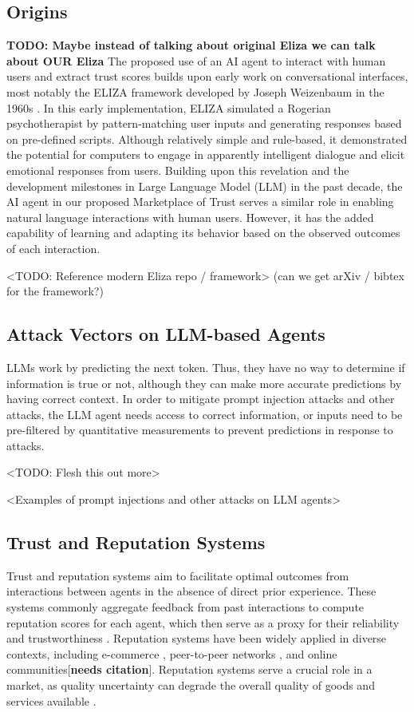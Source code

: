 \documentclass{article}
\begin{document}
\subsection{Origins}

\textbf{TODO: Maybe instead of talking about original Eliza we can talk about OUR Eliza
}
The proposed use of an AI agent to interact with human users and extract trust scores builds upon early work on conversational interfaces, most notably the ELIZA framework developed by Joseph Weizenbaum in the 1960s \cite{ELIZAWeizenbaum1966}. In this early implementation, ELIZA simulated a Rogerian psychotherapist by pattern-matching user inputs and generating responses based on pre-defined scripts. Although relatively simple and rule-based, it demonstrated the potential for computers to engage in apparently intelligent dialogue and elicit emotional responses from users. Building upon this revelation and the development milestones in Large Language Model (LLM) in the past decade, the AI agent in our proposed Marketplace of Trust serves a similar role in enabling natural language interactions with human users. However, it has the added capability of learning and adapting its behavior based on the observed outcomes of each interaction.

<TODO: Reference modern Eliza repo / framework> (can we get arXiv / bibtex for the framework?)

\subsection{Attack Vectors on LLM-based Agents}

LLMs work by predicting the next token. Thus, they have no way to determine if information is true or not, although they can make more accurate predictions by having correct context. In order to mitigate prompt injection attacks and other attacks, the LLM agent needs access to correct information, or inputs need to be pre-filtered by quantitative measurements to prevent predictions in response to attacks.

<TODO: Flesh this out more>

<Examples of prompt injections and other attacks on LLM agents>

\subsection{Trust and Reputation Systems}
Trust and reputation systems aim to facilitate optimal outcomes from interactions between agents in the absence of direct prior experience. These systems commonly aggregate feedback from past interactions to compute reputation scores for each agent, which then serve as a proxy for their reliability and trustworthiness \cite{trustJosang}. Reputation systems have been widely applied in diverse contexts, including e-commerce \cite{EBAYREPResnick}, peer-to-peer networks \cite{p2p_rep}, and online communities[\textbf{needs citation}]. Reputation systems serve a crucial role in a market, as quality uncertainty can degrade the overall quality of goods and services available \cite{LEMONSAkerlof}. 
\end{document}
